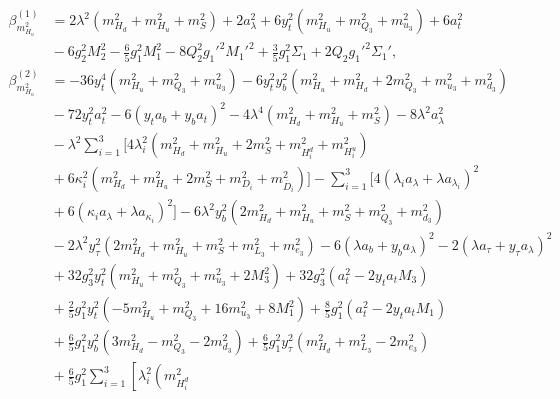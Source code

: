 \documentclass[preprint,amsmath,amssymb,aps,superscriptaddress,prd,
showpacs,floatfix,nofootinbib]{revtex4-1}
\begin{document}
\begin{subequations}
\begin{align}
\beta_{m_{H_u}^2}^{(1)} &= 2 \lambda^2 \left ( m_{H_d}^2 + m_{H_u}^2 +
m_S^2 \right ) + 2 a_\lambda^2 + 6 y_t^2 \left ( m_{H_u}^2 + m_{Q_3}^2 +
m_{u_3}^2 \right ) + 6 a_t^2 \nonumber \\
& {} - 6 g_2^2 M_2^2 - \frac{6}{5} g_1^2 M_1^2 - 8 Q_2^2 g_1'^2 M_1'^2 +
\frac{3}{5} g_1^2 \Sigma_1 + 2 Q_2 g_1'^2 \Sigma_1' ,
\label{eq:USSMmHu2BetaOneLoop} \\
\beta_{m_{H_u}^2}^{(2)} &= -36 y_t^4 \left ( m_{H_u}^2 + m_{Q_3}^2 +
m_{u_3}^2 \right ) - 6 y_t^2 y_b^2 \left ( m_{H_u}^2 + m_{H_d}^2 + 2 m_{Q_3}^2
+ m_{u_3}^2 + m_{d_3}^2 \right ) \nonumber \\
& {} - 72 y_t^2 a_t^2 - 6 \left ( y_t a_b + y_b a_t \right )^2 -
4 \lambda^4 \left ( m_{H_d}^2 + m_{H_u}^2 + m_S^2 \right ) -
8 \lambda^2 a_{\lambda}^2 \nonumber \\
& {} - \lambda^2 \sum_{i=1}^3 \bigg [ 4 \lambda_i^2 \left ( m_{H_d}^2 +
m_{H_u}^2 + 2 m_S^2 + m_{H_i^d}^2 + m_{H_i^u}^2 \right ) \nonumber \\
& {} + 6 \kappa_i^2 \left ( m_{H_d}^2 + m_{H_u}^2 + 2 m_S^2 + m_{D_i}^2 +
m_{\overline{D}_i}^2 \right ) \bigg ] - \sum_{i=1}^3 \big [
4 \left ( \lambda_i a_{\lambda} + \lambda a_{\lambda_i} \right )^2
\nonumber \\
& {} + 6 \left ( \kappa_i a_{\lambda} + \lambda a_{\kappa_i} \right )^2
\big ] - 6 \lambda^2 y_b^2 \left ( 2 m_{H_d}^2 + m_{H_u}^2 + m_S^2 +
m_{Q_3}^2 + m_{d_3}^2 \right ) \nonumber \\
& {} - 2 \lambda^2 y_\tau^2 \left ( 2 m_{H_d}^2 + m_{H_u}^2 + m_S^2 +
m_{L_3}^2 + m_{e_3}^2 \right ) - 6 \left ( \lambda a_b + y_b a_{\lambda}
\right )^2 - 2 \left ( \lambda a_\tau + y_\tau a_{\lambda} \right )^2
\nonumber \\
& {} + 32 g_3^2 y_t^2 \left ( m_{H_u}^2 + m_{Q_3}^2 + m_{u_3}^2 + 2 M_3^2
\right ) + 32 g_3^2 \left ( a_t^2 - 2 y_t a_t M_3 \right ) \nonumber \\
& {} + \frac{2}{5} g_1^2 y_t^2 \left ( -5 m_{H_u}^2 + m_{Q_3}^2 +
16 m_{u_3}^2 + 8 M_1^2 \right ) + \frac{8}{5} g_1^2 \left ( a_t^2 -
2 y_t a_t M_1 \right ) \nonumber \\
& {} + \frac{6}{5} g_1^2 y_b^2 \left ( 3 m_{H_d}^2 - m_{Q_3}^2 - 2 m_{d_3}^2
\right ) + \frac{6}{5} g_1^2 y_\tau^2 \left ( m_{H_d}^2 + m_{L_3}^2 -
2 m_{e_3}^2 \right ) \nonumber \\
& {} + \frac{6}{5} g_1^2 \sum_{i=1}^3 \left [ \lambda_i^2 \left ( m_{H_i^d}^2

\end{align}
\end{subequations}
\end{document}
